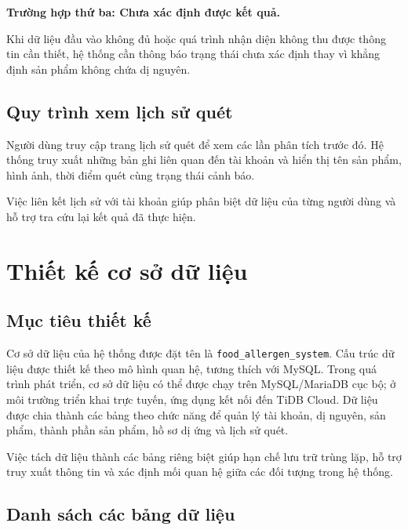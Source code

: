 \textbf{Trường hợp thứ ba: Chưa xác định được kết quả.}

Khi dữ liệu đầu vào không đủ hoặc quá trình nhận diện không thu được thông tin cần thiết, hệ thống cần thông báo trạng thái chưa xác định thay vì khẳng định sản phẩm không chứa dị nguyên.

\subsection{Quy trình xem lịch sử quét}

Người dùng truy cập trang lịch sử quét để xem các lần phân tích trước đó. Hệ thống truy xuất những bản ghi liên quan đến tài khoản và hiển thị tên sản phẩm, hình ảnh, thời điểm quét cùng trạng thái cảnh báo.

Việc liên kết lịch sử với tài khoản giúp phân biệt dữ liệu của từng người dùng và hỗ trợ tra cứu lại kết quả đã thực hiện.


\section{Thiết kế cơ sở dữ liệu}

\subsection{Mục tiêu thiết kế}

Cơ sở dữ liệu của hệ thống được đặt tên là \texttt{food\_allergen\_system}. Cấu trúc dữ liệu được thiết kế theo mô hình quan hệ, tương thích với MySQL. Trong quá trình phát triển, cơ sở dữ liệu có thể được chạy trên MySQL/MariaDB cục bộ; ở môi trường triển khai trực tuyến, ứng dụng kết nối đến TiDB Cloud. Dữ liệu được chia thành các bảng theo chức năng để quản lý tài khoản, dị nguyên, sản phẩm, thành phần sản phẩm, hồ sơ dị ứng và lịch sử quét.

Việc tách dữ liệu thành các bảng riêng biệt giúp hạn chế lưu trữ trùng lặp, hỗ trợ truy xuất thông tin và xác định mối quan hệ giữa các đối tượng trong hệ thống.

\subsection{Danh sách các bảng dữ liệu}

